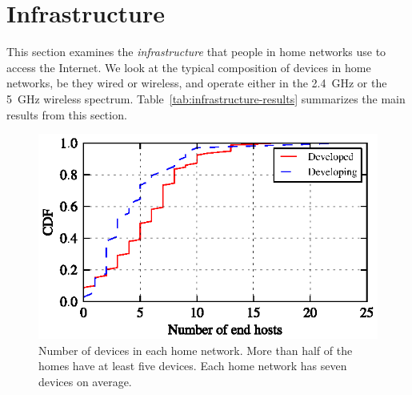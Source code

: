 \section{Infrastructure}\label{sec:infrastructure}

This section examines the {\em infrastructure} that people in home
networks use to access the Internet. We look at the typical composition
of devices in home networks, be they wired or wireless, and
operate either in the 2.4~GHz or the 5~GHz
wireless spectrum. Table~\ref{tab:infrastructure-results} summarizes the main
results from this section.


\begin{figure}[t]
\centering  \includegraphics{figures/health/region_stat/region_stat_cdf}
  \caption{Number of devices in each home network.  More than half of the homes
  have at least five devices. Each home network has seven devices on average.} 
  \label{fig:countofdevices}
\end{figure}



